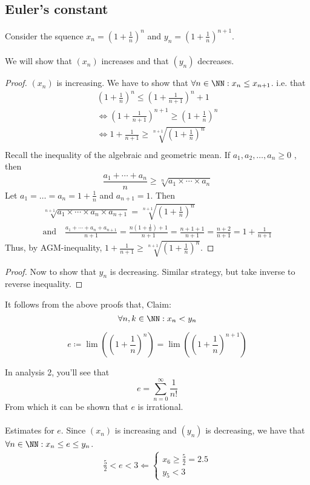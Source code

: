 \documentclass[class=scrartcl, crop=false]{standalone}
\begin{document}
\subsection{Euler's constant}
Consider the squence $x_n = (1 + \frac{1}{n})^n$ and $y_n = (1 + \frac{1}{n})^{n + 1}$.
\\\\
We will show that $(x_n)$ increases and that $(y_n)$ decreases.
\begin{proof}
  $(x_n)$ is increasing. We have to show that $\forall n \in \NN: x_n \leq x_{n + 1}$. i.e. that 
  \begin{gather*}
    (1 + \frac{1}{n})^n \leq (1 + \frac{1}{n + 1})^n + 1 \\
    \Leftrightarrow (1 + \frac{1}{n + 1})^{n + 1} \geq (1 + \frac{1}{n})^n \\
    \Leftrightarrow 1 + \frac{1}{n + 1} \geq \sqrt[n + 1]{(1 + \frac{1}{n})^n} \\
  \end{gather*}
  Recall the inequality of the algebraic and geometric mean. If $ a_1, a_2, \dots, a_n \geq 0$
, then 
\[
  \frac{a_1 + \cdots + a_n}{n} \geq \sqrt[n]{a_1 \times \cdots \times a_n}
\]
Let $a_1 = \dots  = a_n = 1 + \frac{1}{n}$ and $a_{n + 1} = 1$. Then 
\begin{gather*}
  \sqrt[n + 1]{a_1\times\cdots\times a_n \times a_{n + 1}} = \sqrt[n + 1]{(1 + \frac{1}{n})^n}\\
    \text{and}\quad \frac{a_1 + \cdots + a_n + a_{n + 1}}{n + 1} = \frac{n(1 + \frac{1}{n}) + 1}{n + 1} = \frac{n + 1 + 1}{n + 1} = \frac{n + 2}{n + 1} = 1 + \frac{1}{n + 1}
\end{gather*}
Thus, by AGM-inequality, $1 + \frac{1}{n + 1} \geq \sqrt[n + 1]{(1 + \frac{1}{n})^n}$.
\end{proof} \noindent
\begin{proof}
  Now to show that $y_n$ is decreasing. Similar strategy, but take inverse to reverse inequality.
\end{proof} \noindent
It follows from the above proofs that, Claim:
\[\forall n,k \in \NN: x_n < y_n\]

\begin{definition}
  \[e \coloneqq \lim\left((1 + \frac{1}{n})^n\right) = \lim\left((1 + \frac{1}{n})^{n + 1}\right)\]
\end{definition} \noindent
In analysis 2, you'll see that
\[
  e = \sum_{n = 0}^{\infty} \frac{1}{n!}
\]
From which it can be shown that $e$ is irrational.
\\\\
Estimates for $e$. Since $(x_n)$ is increasing and $(y_n)$ is decreasing, we have that $\forall n \in \NN: x_n \leq e \leq y_n$.
\begin{gather*}
  \frac{5}{2} < e < 3 \Leftarrow
  \begin{cases}
    x_6 \geq \frac{5}{2} = 2.5 \\
    y_5 < 3
  \end{cases}
\end{gather*}
\end{document}

